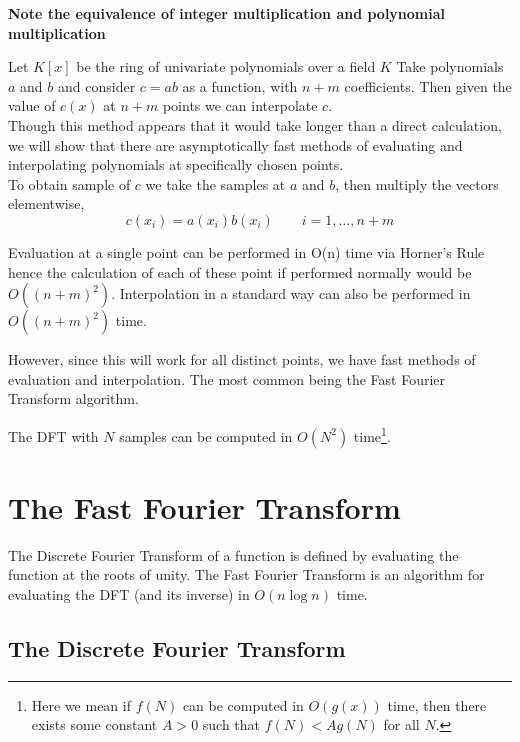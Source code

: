 
\label{chapter2}

\textbf{Note the equivalence of integer multiplication and polynomial multiplication}

Let $K[x]$ be the ring of univariate polynomials over a field $K$
Take polynomials $a$ and $b$ and consider $c = ab$ as a function, with $n + m$ coefficients. Then given the value of $c(x)$ at $n + m$ points we can interpolate $c$.\\
Though this method appears that it would take longer than a direct calculation, we will show that there are asymptotically fast methods of evaluating and interpolating polynomials at specifically chosen points.\\

To obtain sample of $c$ we take the samples at $a$ and $b$, then multiply the vectors elementwise,
\[
  c(x_i) = a(x_i)b(x_i) \qquad i = 1, \ldots, n + m
\]

Evaluation at a single point can be performed in O(n) time via Horner's Rule hence the calculation of each of these point if performed normally would be $O((n + m)^2)$. Interpolation in a standard way can also be performed in $O((n+m)^2)$ time.

However, since this will work for all distinct points, we have fast methods of evaluation and interpolation. The most common being the Fast Fourier Transform algorithm.

\begin{theorem}
The DFT with $N$ samples can be computed in $O(N^2)$ time\footnote{Here we mean if $f(N)$ can be computed in $O(g(x))$ time, then there exists some constant $A > 0$ such that $f(N) < Ag(N)$ for all $N$.}.
\end{theorem}

\section{The Fast Fourier Transform}

The Discrete Fourier Transform of a function is defined by evaluating the function at the roots of unity. The Fast Fourier Transform is an algorithm for evaluating the DFT (and its inverse) in $O(n \log n)$ time.


\subsection{The Discrete Fourier Transform}

